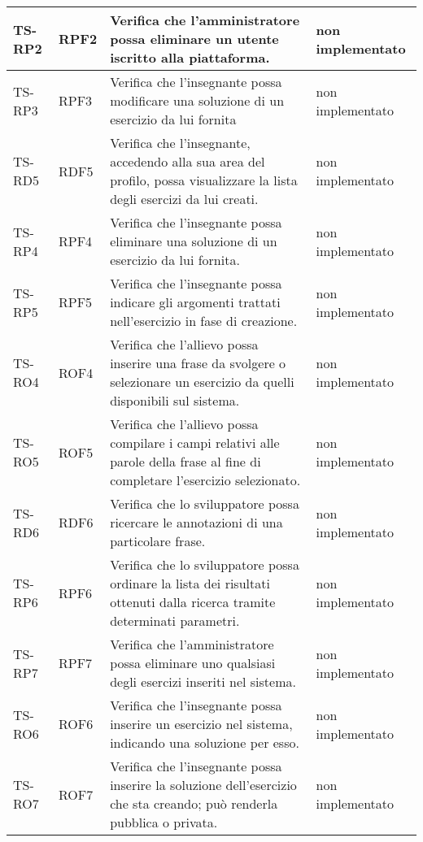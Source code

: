 {\begin{longtable}{|>{\centering\arraybackslash}m{1.6cm}|>{\centering\arraybackslash}m{1.7cm}|m{6.41cm}|>{\centering\arraybackslash}m{3.1cm}|}
		TS-RP2		
		& RPF2 
		& Verifica che l'amministratore possa eliminare un utente iscritto alla piattaforma.
		& non implementato\\ \hline
		\rowcolor{white}
		TS-RP3		
		& RPF3 
		& Verifica che l'insegnante possa modificare una soluzione di un esercizio da lui fornita
		& non implementato\\ \hline
		\rowcolor{LightGray}
		TS-RD5		
		& RDF5 
		& Verifica che l'insegnante, accedendo alla sua area del profilo, possa visualizzare la lista degli esercizi da lui creati. 
		& non implementato\\ \hline
		\rowcolor{white}
		TS-RP4		
		& RPF4 
		& Verifica che l'insegnante possa eliminare una soluzione di un esercizio da lui fornita. 
		& non implementato\\ \hline
		\rowcolor{LightGray}
		TS-RP5		
		& RPF5 
		& Verifica che l'insegnante possa indicare gli argomenti trattati nell'esercizio in fase di creazione.
		& non implementato\\ \hline
		\rowcolor{white}
		TS-RO4		
		& ROF4 
		& Verifica che l'allievo possa inserire una frase da svolgere o selezionare un esercizio da quelli disponibili sul sistema.
		& non implementato\\ \hline
		\rowcolor{LightGray}
		TS-RO5		
		& ROF5 
		& Verifica che l'allievo possa compilare i campi relativi alle parole della frase al fine di completare l'esercizio selezionato.
		& non implementato\\ \hline
		\rowcolor{white}
		TS-RD6		
		& RDF6 
		& Verifica che lo sviluppatore possa ricercare le annotazioni di una particolare frase.
		& non implementato\\ \hline
		\rowcolor{LightGray}
		TS-RP6		
		& RPF6 
		& Verifica che lo sviluppatore possa ordinare la lista dei risultati ottenuti dalla ricerca tramite determinati parametri. 
		& non implementato\\ \hline
		\rowcolor{white}
		TS-RP7		
		& RPF7 
		& Verifica che l'amministratore possa eliminare uno qualsiasi degli esercizi inseriti nel sistema.
		& non implementato\\ \hline
		\rowcolor{LightGray}
		TS-RO6		
		& ROF6 
		& Verifica che l'insegnante possa inserire un esercizio nel sistema, indicando una soluzione per esso. 
		& non implementato\\ \hline
		\rowcolor{white}
		TS-RO7		
		& ROF7 
		& Verifica che l'insegnante possa inserire la soluzione dell'esercizio che sta creando; può renderla pubblica o privata. 
		& non implementato\\ \hline

\end{longtable}}
